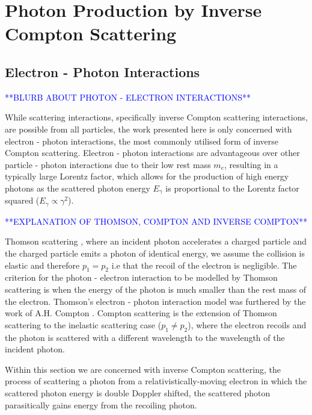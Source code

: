 \documentclass[../main.tex]{subfiles}
\begin{document}
\chapter{Photon Production by Inverse Compton Scattering}
\label{Photon_Production_by_Inverse_Compton_Scattering} %

\section{Electron - Photon Interactions}
\label{sec:electron_photon_interactions}
\textcolor{blue}{**BLURB ABOUT PHOTON - ELECTRON INTERACTIONS**}


While scattering interactions, specifically inverse Compton scattering interactions, are possible from all particles, the work presented here is only concerned with electron - photon interactions, the most commonly utilised form of inverse Compton scattering.  Electron - photon interactions are advantageous over other particle - photon interactions due to their low rest mass $m_{e}$, resulting in a typically large Lorentz factor, which allows for the production of high energy photons as the scattered photon energy $E_{\gamma}$ is proportional to the Lorentz factor squared ($E_{\gamma}\propto\gamma^{2}$).    

\textcolor{blue}{**EXPLANATION OF THOMSON, COMPTON AND INVERSE COMPTON**}

Thomson scattering \cite{thomson1904xxxiv}, where an incident photon accelerates a charged particle and the charged particle emits a photon of identical energy, we assume the collision is elastic and therefore $p_{1} = p_{2}$ i.e that the recoil of the electron is negligible. The criterion for the photon - electron interaction to be modelled by Thomson scattering is when the energy of the photon is much smaller than the rest mass of the electron. Thomson's electron - photon interaction model was furthered by the work of A.H. Compton \cite{compton1923quantum}. Compton scattering is the extension of Thomson scattering to the inelastic scattering case ($p_{1} \neq p_{2}$), where the electron recoils and the photon is scattered with a different wavelength to the wavelength of the incident photon.

Within this section we are concerned with inverse Compton scattering, the process of scattering a photon from a relativistically-moving  electron in which the scattered photon energy is double Doppler shifted, the scattered photon parasitically gains energy from the recoiling photon.  
\end{document}
